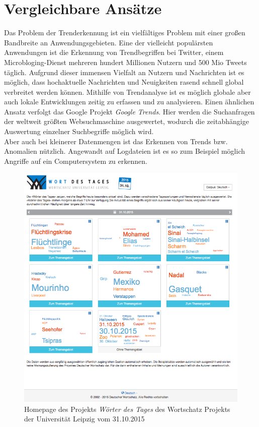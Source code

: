 \section{Vergleichbare Ansätze}
Das Problem der Trenderkennung ist ein vielfältiges Problem mit einer großen Bandbreite an Anwendungsgebieten. Eine der vielleicht populärsten Anwendungen ist die Erkennung von Trendbegriffen bei Twitter, einem Microbloging-Dienst mehreren hundert Millionen Nutzern und 500 Mio Tweets täglich. Aufgrund dieser immensen Vielfalt an Nutzern und Nachrichten ist es möglich, dass hochaktuelle Nachrichten und Neuigkeiten rasend schnell global verbreitet werden können. Mithilfe von Trendanalyse ist es möglich globale aber auch lokale Entwicklungen zeitig zu erfassen und zu analysieren.
Einen ähnlichen Ansatz verfolgt das Google Projekt \emph{Google Trends}. Hier werden die Suchanfragen der weltweit größten Websuchmaschine ausgewertet, wodurch die zeitabhängige Auswertung einzelner Suchbegriffe möglich wird. \\
Aber auch bei kleinerer Datenmengen ist das Erkennen von Trends bzw. Anomalien nützlich. Angewandt auf Logdateien ist es so zum Beispiel möglich Angriffe auf ein Computersystem zu erkennen. \cite{Zwietasch14}

\begin{figure}[h!]
    \centering
    \includegraphics[width=1\textwidth]{pictures/wdt_homepage.png}
    \caption{Homepage des Projekts \emph{Wörter des Tages} des Wortschatz Projekts der Universität Leipzig vom 31.10.2015}\label{pic.homepage}
\end{figure}


